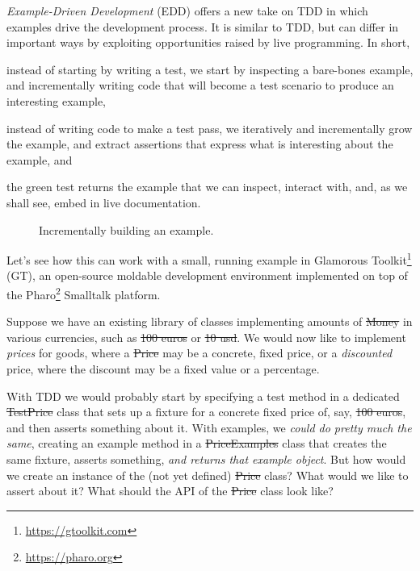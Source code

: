 \documentclass[sigplan,anonymous,review,10pt]{acmart}
\begin{document}
\emph{Example-Driven Development} (EDD) offers a new take on TDD in which examples drive the development process.
It is similar to TDD, but can differ in important ways by exploiting opportunities raised by live programming.
In short,
\begin{inparaenum}[(i)]
	\item instead of starting by writing a test, we start by inspecting a bare-bones example, and incrementally writing code that will become a test scenario to produce an interesting example,
	\item instead of writing code to make a test pass, we iteratively and incrementally grow the example, and extract assertions that express what is interesting about the example,
and
	\item the green test returns the example that we can inspect, interact with, and, as we shall see, embed in live documentation.
\end{inparaenum}

\begin{figure}[t]
\centering
{}\qquad
{}\qquad
{}\qquad
{}\qquad
  \caption{Incrementally building an example.}
  \label{fig:exampleCreation}
\end{figure}

Let's see how this can work with a small, running example in Glamorous Toolkit\footnote{\url{https://gtoolkit.com}} (GT), an open-source moldable development environment implemented on top of the Pharo\footnote{\url{https://pharo.org}} Smalltalk  platform.

Suppose we have an existing library of classes implementing amounts of \st{Money} in various currencies, such as \st{100 euros} or \st{10 usd}.
We would now like to implement \emph{prices} for goods, where a \st{Price} may be a concrete, fixed price, or a \emph{discounted} price, where the discount may be a fixed value or a percentage.

With TDD we would probably start by specifying a test method in a dedicated \st{TestPrice} class that sets up a fixture for a concrete fixed price of, say, \st{100 euros}, and then asserts something about it.
With examples, we \emph{could do pretty much the same}, creating an example method in a \st{PriceExamples} class that creates the same fixture, asserts something, \emph{and returns that example object}.
But how would we create an instance of the (not yet defined) \st{Price} class?
What would we like to assert about it?
What should the API of the \st{Price} class look like?
\end{document}
